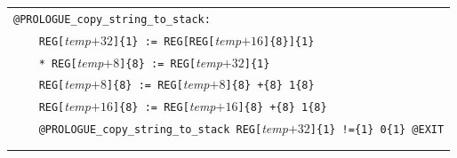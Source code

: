 \documentclass[10pt,twocolumn]{article}
\begin{document}
\begin{table}[!h]
\begin{center}
\def\arraystretch{1}
\begin{tabular}{l}


\texttt{@PROLOGUE\_copy\_string\_to\_stack:}\\ %
\texttt{~~~~REG[}\textit{temp}$ +32 $\texttt{]\{1\} := REG[REG[}\textit{temp}$
+16 $\texttt{]\{8\}]\{1\}}\\ %
\texttt{~~~~* REG[}\textit{temp}$ +8 $\texttt{]\{8\} := REG[}\textit{temp}$ +32
$\texttt{]\{1\} }\\ %
\texttt{~~~~REG[}\textit{temp}$ +8 $\texttt{]\{8\} := REG[}\textit{temp}$ +8
$\texttt{]\{8\} +\{8\} 1\{8\}}\\ %
\texttt{~~~~REG[}\textit{temp}$ +16 $\texttt{]\{8\} := REG[}\textit{temp}$ +16
$\texttt{]\{8\} +\{8\} 1\{8\}}\\ %
\texttt{~~~~@PROLOGUE\_copy\_string\_to\_stack REG[}\textit{temp}$ +32 $\texttt{]\{1\}
!=\{1\} 0\{1\} @EXIT}\\ %
\\ \\



\end{tabular}
\end{center}
\end{table}
\end{document}
